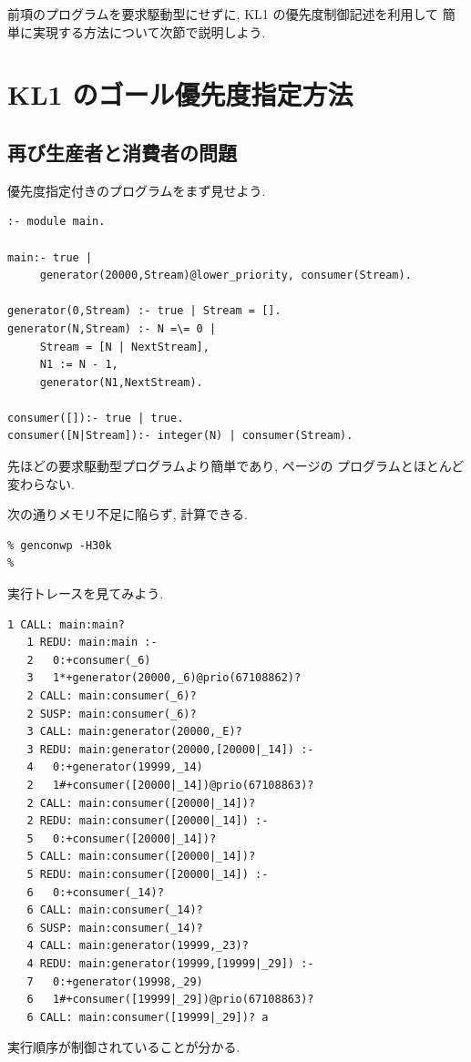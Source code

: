 \documentclass[a4,titlepage]{jsreport}
\begin{document}
前項のプログラムを要求駆動型にせずに, KL1 の優先度制御記述を利用して
簡単に実現する方法について次節で説明しよう.  

\section{KL1 のゴール優先度指定方法}
\subsection{再び生産者と消費者の問題}
優先度指定付きのプログラムをまず見せよう.  
\begin{center}
\begin{minipage}{12cm}
\begin{Verbatim}[baselinestretch=0.8]
%  genconwp.kl1
:- module main.

main:- true |
     generator(20000,Stream)@lower_priority, consumer(Stream).

generator(0,Stream) :- true | Stream = [].
generator(N,Stream) :- N =\= 0 |
     Stream = [N | NextStream],
     N1 := N - 1,
     generator(N1,NextStream).

consumer([]):- true | true.
consumer([N|Stream]):- integer(N) | consumer(Stream).
\end{Verbatim}
\end{minipage}
\end{center}

先ほどの要求駆動型プログラムより簡単であり, \pageref{gencon} ページの
プログラムとほとんど変わらない.

次の通りメモリ不足に陥らず, 計算できる.  
\begin{Verbatim}[frame=single,baselinestretch=0.8]
% klic -o genconwp genconwp.kl1
% genconwp -H30k
%
\end{Verbatim}
実行トレースを見てみよう.  
\begin{Verbatim}[frame=single,baselinestretch=0.8]
   1 CALL: main:main? 
   1 REDU: main:main :-
   2   0:+consumer(_6)
   3   1*+generator(20000,_6)@prio(67108862)? 
   2 CALL: main:consumer(_6)? 
   2 SUSP: main:consumer(_6)? 
   3 CALL: main:generator(20000,_E)? 
   3 REDU: main:generator(20000,[20000|_14]) :-
   4   0:+generator(19999,_14)
   2   1#+consumer([20000|_14])@prio(67108863)? 
   2 CALL: main:consumer([20000|_14])? 
   2 REDU: main:consumer([20000|_14]) :-
   5   0:+consumer([20000|_14])? 
   5 CALL: main:consumer([20000|_14])? 
   5 REDU: main:consumer([20000|_14]) :-
   6   0:+consumer(_14)? 
   6 CALL: main:consumer(_14)? 
   6 SUSP: main:consumer(_14)? 
   4 CALL: main:generator(19999,_23)? 
   4 REDU: main:generator(19999,[19999|_29]) :-
   7   0:+generator(19998,_29)
   6   1#+consumer([19999|_29])@prio(67108863)? 
   6 CALL: main:consumer([19999|_29])? a
\end{Verbatim}
実行順序が制御されていることが分かる.  
\end{document}
